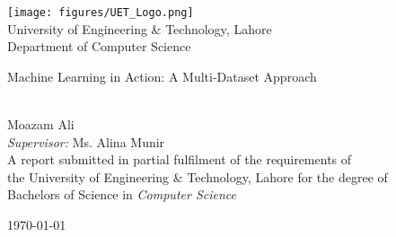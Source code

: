 \documentclass[a4paper,11pt,oneside]{book}
\begin{document}
    
    \frontmatter
    
    \begin{titlepage}      
        \begin{center}
            \texttt{[image: figures/UET\_Logo.png]}\\[0.5cm]
            {\LARGE University of Engineering \& Technology, Lahore\\[0.5cm]
            Department of Computer Science}\\[2cm]
			
            \linespread{1.2}\huge {
                Machine Learning in Action: A Multi-Dataset Approach
            
            }
            \linespread{1}~\\[2cm]
            {\Large 
                Moazam Ali
            }\\[1cm] 
            

            {\large 
                \emph{Supervisor:} Ms. Alina Munir}\\[1cm] %
            
            \large A report submitted in partial fulfilment of the requirements of\\the University of Engineering \& Technology, Lahore for the degree of\\
            Bachelors of Science 
            in \textit{Computer Science}\\[0.3cm] 
            \vfill
            
            
            \today %
        \end{center}
    \end{titlepage}
    
\end{document}

